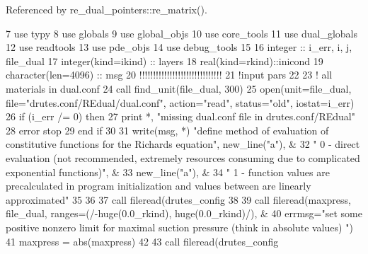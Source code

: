 Referenced by re\+\_\+dual\+\_\+pointers\+::re\+\_\+matrix().


\begin{DoxyCode}
7      \textcolor{keywordtype}{use }typy
8      \textcolor{keywordtype}{use }globals
9      \textcolor{keywordtype}{use }global_objs
10      \textcolor{keywordtype}{use }core_tools
11      \textcolor{keywordtype}{use }dual_globals
12      \textcolor{keywordtype}{use }readtools
13      \textcolor{keywordtype}{use }pde_objs
14      \textcolor{keywordtype}{use }debug_tools
15      
16       \textcolor{keywordtype}{integer} :: i\_err, i, j, file\_dual
17       \textcolor{keywordtype}{integer(kind=ikind)} :: layers
18           \textcolor{keywordtype}{real(kind=rkind)}::inicond
19           \textcolor{keywordtype}{character(len=4096)} :: msg    
20       \textcolor{comment}{!!!!!!!!!!!!!!!!!!!!!!!!!!!!!!}
21       \textcolor{comment}{!input pars}
22       
23       \textcolor{comment}{! all materials in dual.conf}
24       \textcolor{keyword}{call }find_unit(file\_dual, 300)
25       \textcolor{keyword}{open}(unit=file\_dual, file=\textcolor{stringliteral}{"drutes.conf/REdual/dual.conf"}, action=\textcolor{stringliteral}{"read"}, status=\textcolor{stringliteral}{"old"}, iostat=i\_err)
26       \textcolor{keywordflow}{if} (i\_err /= 0) \textcolor{keywordflow}{then}
27         print *, \textcolor{stringliteral}{"missing dual.conf file in drutes.conf/REdual"}
28         error stop
29 \textcolor{keywordflow}{      end if} 
30       
31       \textcolor{keyword}{write}(msg, *) \textcolor{stringliteral}{"define method of evaluation of constitutive functions for the Richards equation"}, 
      new\_line(\textcolor{stringliteral}{"a"}), &
32         \textcolor{stringliteral}{"   0 - direct evaluation (not recommended, extremely resources consuming due to complicated
       exponential functions)"}, &
33         new\_line(\textcolor{stringliteral}{"a"}), &
34         \textcolor{stringliteral}{"   1 - function values are precalculated in program initialization and values between are linearly
       approximated"}
35 
36       
37       \textcolor{keyword}{call }fileread(drutes_config%
38       
39       \textcolor{keyword}{call }fileread(maxpress, file\_dual, ranges=(/-huge(0.0\_rkind), huge(0.0\_rkind)/), &
40                 errmsg=\textcolor{stringliteral}{"set some positive nonzero limit for maximal suction pressure (think in absolute
       values) "})
41                 maxpress = abs(maxpress)
42       
43       \textcolor{keyword}{call }fileread(drutes_config%

\end{DoxyCode}
